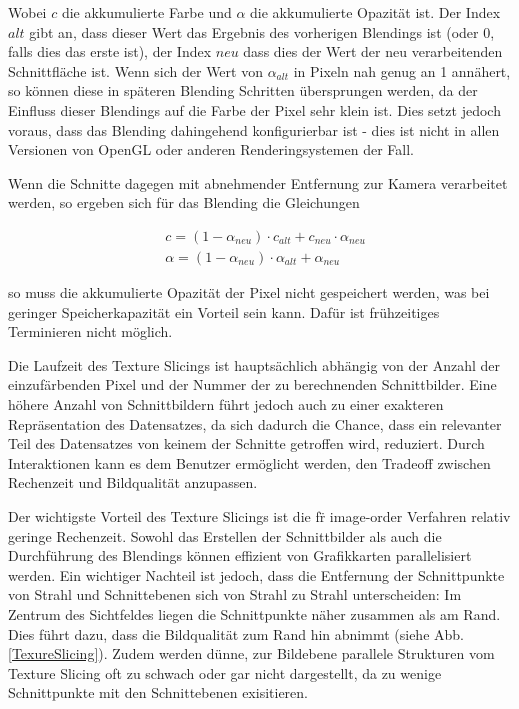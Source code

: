 \documentclass[a4paper,fontsize=12pt,toc=bib,halfparskip]{scrartcl}
\begin{document}
Wobei $c$ die akkumulierte Farbe und $\alpha$ die akkumulierte Opazit\"at ist. Der Index $alt$ gibt an, dass dieser Wert das Ergebnis des vorherigen Blendings ist (oder 0, falls dies das erste ist), der Index $neu$ dass dies der Wert der neu verarbeitenden Schnittfl\"ache ist. Wenn sich der Wert von $\alpha_{alt}$ in Pixeln nah genug an 1 ann\"ahert, so k\"onnen diese in sp\"ateren Blending Schritten \"ubersprungen werden, da der Einfluss dieser Blendings auf die Farbe der Pixel sehr klein ist. Dies setzt jedoch voraus, dass das Blending dahingehend konfigurierbar ist - dies ist nicht in allen Versionen von OpenGL oder anderen Renderingsystemen der Fall. 

Wenn die Schnitte dagegen mit abnehmender Entfernung zur Kamera verarbeitet werden, so ergeben sich f\"ur das Blending die Gleichungen

\begin{align}
&c = (1-\alpha_{neu})\cdot c_{alt}+c_{neu}\cdot\alpha_{neu}
\label{back-to-front-color}\\ 
&\alpha = (1-\alpha_{neu})\cdot\alpha_{alt} + \alpha_{neu}
\label{back-to-front-alpha}
\end{align}

so muss die akkumulierte Opazit\"at der Pixel nicht gespeichert werden, was bei geringer Speicherkapazit\"at ein Vorteil sein kann. Daf\"ur ist fr\"uhzeitiges Terminieren nicht m\"oglich.

Die Laufzeit des Texture Slicings ist haupts\"achlich abh\"angig von der Anzahl der einzuf\"arbenden Pixel und der Nummer der zu berechnenden Schnittbilder. Eine h\"ohere Anzahl von Schnittbildern f\"uhrt jedoch auch zu einer exakteren Repr\"asentation des Datensatzes, da sich dadurch die Chance, dass ein relevanter Teil des Datensatzes von keinem der Schnitte getroffen wird, reduziert. Durch Interaktionen kann es dem Benutzer erm\"oglicht werden, den Tradeoff zwischen Rechenzeit und Bildqualit\"at anzupassen.

Der wichtigste Vorteil des Texture Slicings ist die f\"r image-order Verfahren relativ geringe Rechenzeit. Sowohl das Erstellen der Schnittbilder als auch die Durchf\"uhrung des Blendings k\"onnen effizient von Grafikkarten parallelisiert werden. Ein wichtiger Nachteil ist jedoch, dass die Entfernung der Schnittpunkte von Strahl und Schnittebenen sich von Strahl zu Strahl unterscheiden: Im Zentrum des Sichtfeldes liegen die Schnittpunkte n\"aher zusammen als am Rand. Dies f\"uhrt dazu, dass die Bildqualit\"at zum Rand hin abnimmt (siehe Abb. \ref{TexureSlicing}). Zudem werden d\"unne, zur Bildebene parallele Strukturen vom Texture Slicing oft zu schwach oder gar nicht dargestellt, da zu wenige Schnittpunkte mit den Schnittebenen exisitieren.
\end{document}
